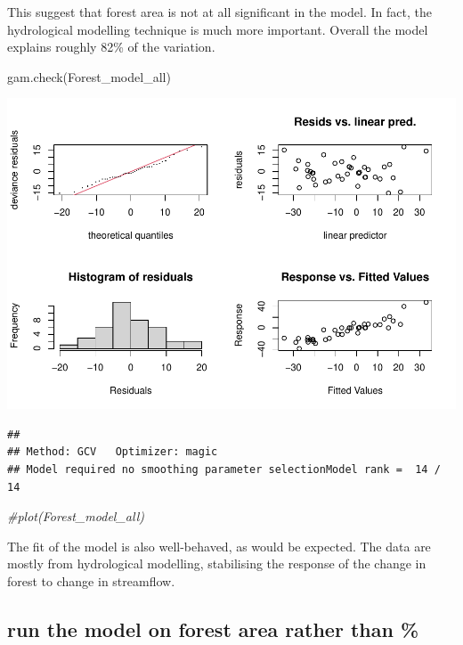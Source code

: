 \documentclass[]{elsarticle} %
\newenvironment{Shaded}{\begin{snugshade}}{\end{snugshade}}
\newcommand{\CommentTok}[1]{\textcolor[rgb]{0.56,0.35,0.01}{\textit{#1}}}
\newcommand{\FunctionTok}[1]{\textcolor[rgb]{0.00,0.00,0.00}{#1}}
\newcommand{\NormalTok}[1]{#1}
\begin{document}
This suggest that forest area is not at all significant in the model. In fact, the hydrological modelling technique is much more important. Overall the model explains roughly 82\% of the variation.

\begin{Shaded}
\begin{Highlighting}[]
\FunctionTok{gam.check}\NormalTok{(Forest\_model\_all)}
\end{Highlighting}
\end{Shaded}

\includegraphics{Test_model_totalForestArea_files/figure-latex/check-model-percent-1.pdf}

\begin{verbatim}
## 
## Method: GCV   Optimizer: magic
## Model required no smoothing parameter selectionModel rank =  14 / 14
\end{verbatim}

\begin{Shaded}
\begin{Highlighting}[]
\CommentTok{\#plot(Forest\_model\_all)}
\end{Highlighting}
\end{Shaded}

The fit of the model is also well-behaved, as would be expected. The data are mostly from hydrological modelling, stabilising the response of the change in forest to change in streamflow.

\hypertarget{run-the-model-on-forest-area-rather-than}{%
\subsection{run the model on forest area rather than \%}\label{run-the-model-on-forest-area-rather-than}}
\end{document}
